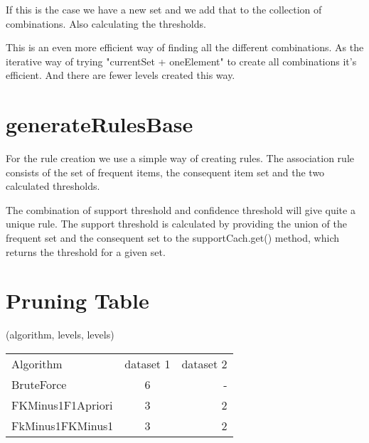 \documentclass[12pt, a4paper]{article}
\begin{document}
If this is the case we have a new set and we add that to the collection of combinations. Also calculating the thresholds.

This is an even more efficient way of finding all the different combinations.
As the iterative way of trying "currentSet + oneElement" to create all combinations it's efficient. And there are fewer levels created this way. 

\section{generateRulesBase}
For the rule creation we use a simple way of creating rules. 
The association rule consists of the set of frequent items, the consequent item set and the two calculated thresholds. 

The combination of support threshold and confidence threshold will give quite a unique rule. 
The support threshold is calculated by providing  the union of the frequent set and the consequent set to the supportCach.get() method, which returns the threshold for a given set. 

\section{Pruning Table}

(algorithm, levels, levels)\\
\begin{tabular}{ l c r }
  Algorithm & dataset 1 & dataset 2 \\
  BruteForce & 6 & - \\
  FKMinus1F1Apriori & 3 & 2 \\
  FkMinus1FKMinus1 & 3 & 2 \\
\end{tabular}
\end{document}

